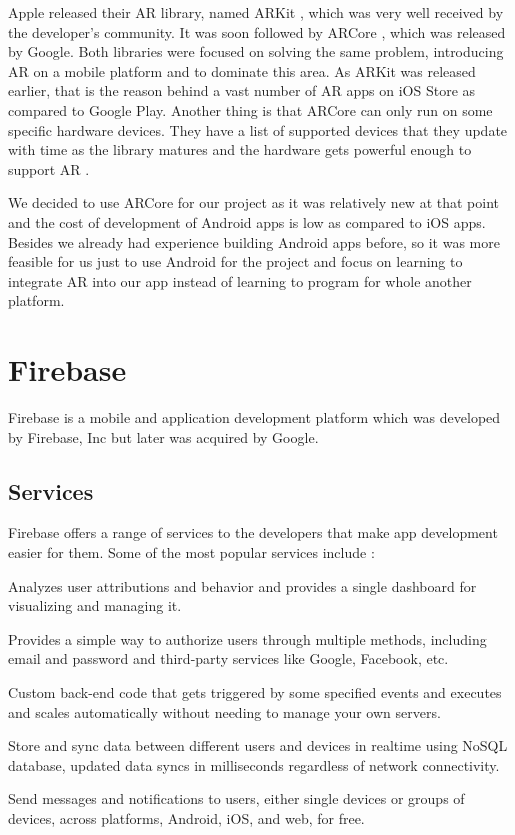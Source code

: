 Apple released their AR library, named ARKit \cite{ARKitDevelopers2018}, which was very well received by the developer's community. It was soon followed by ARCore \cite{ARCoreDevelopers2018}, which was released by Google. Both libraries were focused on solving the same problem, introducing AR on a mobile platform and to dominate this area. As ARKit was released earlier, that is the reason behind a vast number of AR apps on iOS Store as compared to Google Play. Another thing is that ARCore can only run on some specific hardware devices. They have a list of supported devices that they update with time as the library matures and the hardware gets powerful enough to support AR \cite{ARCoreSupportedDevices2018}.

We decided to use ARCore for our project as it was relatively new at that point and the cost of development of Android apps is low as compared to iOS apps. Besides we already had experience building Android apps before, so it was more feasible for us just to use Android for the project and focus on learning to integrate AR into our app instead of learning to program for whole another platform.

\section{Firebase}
Firebase is a mobile and application development platform which was developed by Firebase, Inc but later was acquired by Google\cite{FirebaseWikipedia2018}. 

\subsection{Services}
Firebase offers a range of services to the developers that make app development easier for them. Some of the most popular services include \cite{Firebase2018}:
\begin{description}[font=$\bullet$~, leftmargin=0cm]
    \item[Google Analytics] Analyzes user attributions and behavior and provides a single dashboard for visualizing and managing it.
    \item[Authentication] Provides a simple way to authorize users through multiple methods, including email and password and third-party services like Google, Facebook, etc.
    \item[Cloud Functions] Custom back-end code that gets triggered by some specified events and executes and scales automatically without needing to manage your own servers.
    \item[Realtime Database] Store and sync data between different users and devices in realtime using NoSQL database, updated data syncs in milliseconds regardless of network connectivity.
    \item[Cloud Messaging] Send messages and notifications to users, either single devices or groups of devices, across platforms, Android, iOS, and web, for free.
\end{description}


